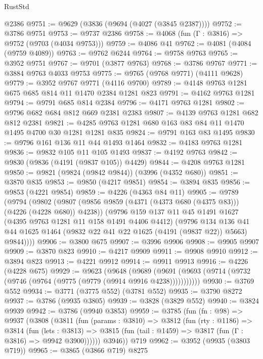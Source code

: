 \begin{lexlean}{RustStd}
\begin{coremodule}
    @2386
@9751 := @9629 (@3836 (@9694 (@4027 (@3845 @2387))))
@9752 := @3786 @9751
@9753 := @9737 @2386
@9758 := @4068 (fun (Γ : @3816) => @9752 (@9703 (@4034 @9753)))
@9759 := @4086 @41
@9762 := @4081 (@4084 (@9759 @4089))
@9763 := @9762 @6244
@9764 := @9758 @9763
@9765 := @3952 @9751
@9767 := @9701 (@3877 @9763)
@9768 := @3786 @9767
@9771 := @3884 @9763 @4033 @9753
@9775 := @9765 (@9768 @9771) (@4111 @9628)
@9779 := @3952 @9767 @9771 (@4116 @9700)
@9789 := @4148 @9763 @1281 @675 @685 @814 @11 @1470 @2384 @1281 @823
@9791 := @4162 @9763 @1281
@9794 := @9791 @685 @814 @2384
@9796 := @4171 @9763 @1281
@9802 := @9796 @682 @684 @812 @669 @2381 @2383
@9807 := @4139 @9763 @1281 @682 @812 @2381
@9821 := @4285 @9763 @1281 @680 @163 @83 @84 @11 @1470 @1495 @4700 @30 @1281 @1281 @835
@9824 := @9791 @163 @83 @1495
@9830 := @9796 @161 @136 @11 @44 @1493 @1464
@9832 := @4183 @9763 @1281
@9836 := @9832 @105 @11 @105 @1493
@9837 := @4192 @9763
@9842 := @9830 (@9836 (@4191 (@9837 @105)) @4429)
@9844 := @4208 @9763 @1281
@9850 := @9821 (@9824 (@9842 @9844)) (@3996 (@4352 @680))
@9851 := @3870 @835
@9853 := @9850 (@4217 @9851)
@9854 := @3894 @835
@9856 := @9853 (@4221 @9854)
@9859 := @4226 (@4363 @84 @11)
@9905 := @9789
    (@9794
      (@9802
        (@9807 (@9856 @9859 (@4371 (@4373 @680 (@4375 @83))) (@4226 (@4228 @680)) @4238))
        (@9796
          @159
          @137
          @11
          @45
          @1491
          @1627
          (@4395 @9763 @1281 @11 @158 @1491 @4406 @4412)
          (@9796
            @134
            @136
            @41
            @44
            @1625
            @1464
            (@9832 @22 @41 @22 @1625 (@4191 (@9837 @22)) @5663)
            @9844))))
@9906 := @3800 @675
@9907 := @3996 @9906
@9908 := @9905 @9907
@9909 := @3870 @823
@9910 := @4217 @9909
@9911 := @9908 @9910
@9912 := @3894 @823
@9913 := @4221 @9912
@9914 := @9911 @9913
@9916 := @4226 (@4228 @675)
@9929 := @9623
    (@9648
      (@9689 (@9691 (@9693 (@9714 (@9732 (@9746 (@9764 (@9775 (@9779 (@9914 @9916 @4238)))))))))))
@9930 := @3769 @552
@9934 := @3771 (@3775 @552) (@3781 @552)
@9935 := @3790 @8272
@9937 := @3786 (@9935 @3805)
@9939 := @3828 (@3829 @552)
@9940 := @3824 @9939
@9942 := @3786 (@9940 @3853)
@9959 := @3785
    (fun (fn : @98) =>
    @9937
      (@3808
        (@3811
          (fun (params : @3810) =>
          @3812
            (fun (rty : @1186) =>
            @3814
              (fun (lets : @3813) =>
              @3815 (fun (tail : @1459) => @3817 (fun (Γ : @3816) => @9942 @3900))))))
        @3946))
    @719
@9962 := @3952 (@9935 (@3803 @719))
@9965 := @3865 (@3866 @719) @8275

\end{coremodule}
\end{lexlean}
